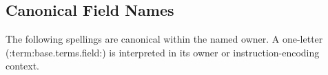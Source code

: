 \subsection{Canonical Field Names}

The following spellings are canonical within the named owner. A one-letter (:term:base.terms.field:) is interpreted in its owner or
instruction-encoding context.


